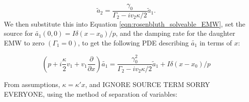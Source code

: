 \begin{equation}
	\tilde{a}_2 = \frac{\gamma_0}{\Gamma_2 - i v_2 \kappa/2}\tilde{a}_1.
\end{equation} We then substitute this into Equation \ref{eqn:rosenbluth_solveable_EMW}, set the source for $\tilde{a_1}(0,0) = I\delta(x-x_0)/p$, and the damping rate for the daughter EMW to zero $(\Gamma_1=0)$, to get the following PDE describing $\tilde{a_1}$ in terms of $x$:

\begin{equation}
	\left(p + i\frac{\kappa}{2}v_1 + v_1\frac{\partial}{\partial x}\right)\tilde{a_1} = \frac{\gamma_0^2}{\Gamma_2 - i v_2 \kappa/2}\tilde{a}_1 + I\delta(x-x_0)/p
\end{equation}

From assumptions, $\kappa = \kappa' x$, and IGNORE SOURCE TERM SORRY EVERYONE, using the method of separation of variables:
